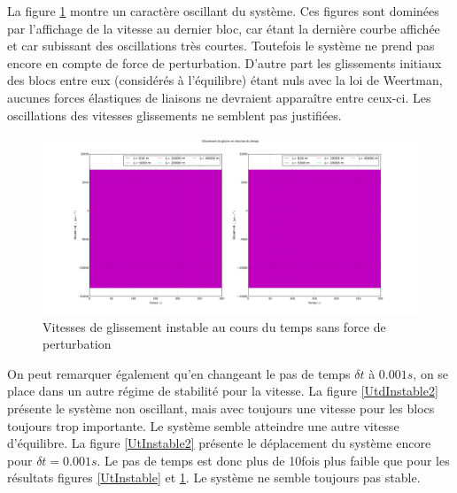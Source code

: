 \documentclass[11pt, a4paper]{article}
\begin{document}
La figure \ref{UtdInstable} montre un caractère oscillant du système. Ces figures sont dominées par l'affichage de la vitesse au dernier bloc, car étant la dernière courbe affichée et car subissant des oscillations très courtes. Toutefois le système ne prend pas encore en compte de force de perturbation. D'autre part les glissements initiaux des blocs entre eux (considérés à l'équilibre) étant nuls avec la loi de Weertman, aucunes forces élastiques de liaisons ne devraient apparaître entre ceux-ci. Les oscillations des vitesses glissements ne semblent pas justifiées.
\\

\begin{figure}[h!]
    \centering
    \includegraphics[width=1\linewidth]{figures/Part1/VitesseDt0012.png}
    \caption{Vitesses de glissement instable au cours du temps sans force de perturbation}
    \label{UtdInstable}
\end{figure}
On peut remarquer également qu'en changeant le pas de temps $\delta t$ à $0.001s$, on se place dans un autre régime de stabilité pour la vitesse. La figure \ref{UtdInstable2} présente le système non oscillant, mais avec toujours une vitesse pour les blocs toujours trop importante. Le système semble atteindre une autre vitesse d'équilibre. La figure \ref{UtInstable2} présente le déplacement du système encore pour $\delta t = 0.001s$. Le pas de temps est donc plus de 10fois plus faible que pour les résultats figures \ref{UtInstable} et \ref{UtdInstable}. Le système ne semble toujours pas stable.
\\
\end{document}
